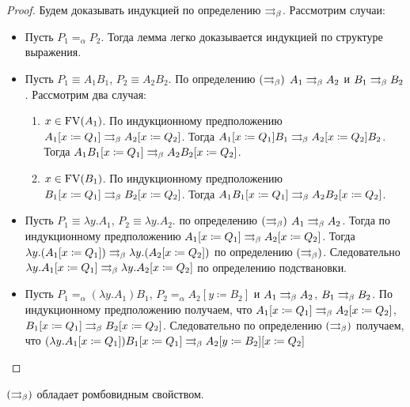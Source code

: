 \begin{proof}
	Будем доказывать индукцией по определению $\rightrightarrows_{\beta} $. Рассмотрим случаи:
	\begin{itemize}
		\item Пусть $P_{1}=_{\alpha}P_{2}$. Тогда лемма легко доказывается индукцией по структуре выражения.
		\item Пусть $P_{1}\equiv{}A_{1}B_{1}$, $P_{2}\equiv{}A_{2}B_{2}$. По определению $(\rightrightarrows_{\beta})$ $A_{1} \rightrightarrows_{\beta} A_{2}$ и $B_{1} \rightrightarrows_{\beta} B_{2}$.
		Рассмотрим два случая:
		\begin{enumerate}
			\item $x \in \operatorname{FV}(A_{1})$. По индукционному предположению $A_{1}[x\coloneqq{}Q_{1}] \rightrightarrows_{\beta} A_{2}[x\coloneqq{}Q_{2}]$. Тогда $A_{1}[x\coloneqq{}Q_{1}]B_{1} \rightrightarrows_{\beta} A_{2}[x\coloneqq{}Q_{2}]B_{2}$. Тогда $A_{1}B_{1}[x\coloneqq{}Q_{1}] \rightrightarrows_{\beta} A_{2}B_{2}[x\coloneqq{}Q_{2}]$.
			\item $x \in \operatorname{FV}(B_{1})$. По индукционному предположению $B_{1}[x\coloneqq{}Q_{1}] \rightrightarrows_{\beta} B_{2}[x\coloneqq{}Q_{2}]$. Тогда $A_{1}B_{1}[x\coloneqq{}Q_{1}] \rightrightarrows_{\beta} A_{2}B_{2}[x\coloneqq{}Q_{2}]$.
		\end{enumerate}
		\item Пусть $P_{1}\equiv{}\lambda{}y.A_{1}$, $P_{2}\equiv{}\lambda{}y.A_{2}$. по определению $(\rightrightarrows_{\beta})$ $A_{1}\rightrightarrows_{\beta} A_{2}$. Тогда по индукционному предположению $A_{1}[x\coloneqq{}Q_{1}] \rightrightarrows_{\beta} A_{2}[x\coloneqq{}Q_{2}]$. Тогда 
		$\lambda{}y.(A_{1}[x\coloneqq{}Q_{1}]) \rightrightarrows_{\beta} \lambda{}y.(A_{2}[x\coloneqq{}Q_{2}])$ по определению $(\rightrightarrows_{\beta})$. Следовательно 	$\lambda{}y.A_{1}[x\coloneqq{}Q_{1}] \rightrightarrows_{\beta} \lambda{}y.A_{2}[x\coloneqq{}Q_{2}]$ по определению подствановки.
		\item Пусть $P_{1}=_\alpha(\lambda{}y.A_1)B_1$, $P_{2}=_\alpha A_2[y\coloneqq{}B_2]$ и $ A_1 \rightrightarrows_{\beta} A_2 $, $ B_1 \rightrightarrows_{\beta} B_2 $. По индукционному предположению получаем, что $A_1[x \coloneqq Q_1] \rightrightarrows_{\beta} A_2[x \coloneqq Q_2]$, $B_1[x \coloneqq Q_1] \rightrightarrows_{\beta} B_2[x \coloneqq Q_2]$. Следовательно по определению $(\rightrightarrows_{\beta})$ получаем, что $ (\lambda{}y.A_1[x\coloneqq Q_1])B_1[x \coloneqq Q_1] \rightrightarrows_{\beta}  A_2[y \coloneqq B_2][x \coloneqq Q_2]$
	\end{itemize}
\end{proof}

\begin{lemma}
	$(\rightrightarrows_{\beta})$ обладает ромбовидным свойством.
\end{lemma}

